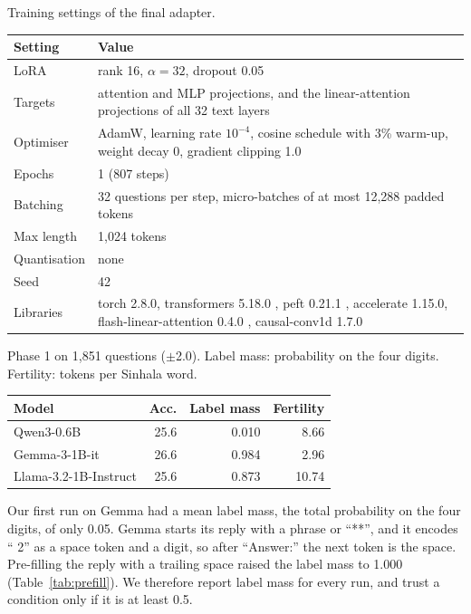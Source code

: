 \begin{center}\captionsetup{type=table}
\small
\caption{Training settings of the final adapter.}\label{tab:training}
\begin{tabularx}{\columnwidth}{@{}L{0.24\columnwidth}Y@{}}
\toprule
Setting & Value \\
\midrule
LoRA & rank 16, $\alpha = 32$, dropout 0.05 \\
Targets & attention and MLP projections, and the linear-attention projections of all 32 text layers \\
Optimiser & AdamW, learning rate $10^{-4}$, cosine schedule with 3\% warm-up, weight decay 0, gradient clipping 1.0 \\
Epochs & 1 (807 steps) \\
Batching & 32 questions per step, micro-batches of at most 12,288 padded tokens \\
Max length & 1,024 tokens \\
Quantisation & none \\
Seed & 42 \\
Libraries & torch 2.8.0, transformers 5.18.0 \citep{wolf2020transformers}, peft 0.21.1 \citep{mangrulkar2022peft}, accelerate 1.15.0, flash-linear-attention 0.4.0 \citep{yang2024fla}, causal-conv1d 1.7.0 \\
\bottomrule
\end{tabularx}
\end{center}

\begin{center}\captionsetup{type=table}
\small
\caption{Phase 1 on 1,851 questions ($\pm$2.0). Label mass: probability on the four digits. Fertility: tokens per Sinhala word.}\label{tab:small}
\begin{tabularx}{\columnwidth}{@{}Yrrr@{}}
\toprule
Model & Acc. & Label mass & Fertility \\
\midrule
Qwen3-0.6B & 25.6 & 0.010 & 8.66 \\
Gemma-3-1B-it & 26.6 & 0.984 & 2.96 \\
Llama-3.2-1B-Instruct & 25.6 & 0.873 & 10.74 \\
\bottomrule
\end{tabularx}
\end{center}

 Our first run on Gemma had a mean label mass, the total probability on the four digits, of only 0.05. Gemma starts its reply with a phrase or ``**'', and it encodes `` 2'' as a space token and a digit, so after ``Answer:'' the next token is the space. Pre-filling the reply with a trailing space raised the label mass to 1.000 (Table~\ref{tab:prefill}). We therefore report label mass for every run, and trust a condition only if it is at least 0.5.


